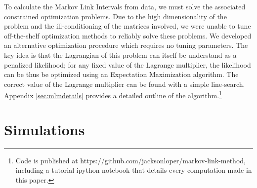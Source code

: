 \documentclass{article}
\theoremstyle{definition}
\begin{document}
To calculate the Markov Link Intervals from data, we must solve the associated constrained optimization problems.  Due to the high dimensionality of the problem and the ill-conditioning of the matrices involved, we were unable to tune off-the-shelf optimization methods to reliably solve these problems.  We developed an alternative optimization procedure which requires no tuning parameters.  The key idea is that the Lagrangian of this problem can itself be understand as a penalized likelihood; for any fixed value of the Lagrange multiplier, the likelihood can be thus be optimized using an Expectation Maximization algorithm.  The correct value of the Lagrange multiplier can be found with a simple line-search.  Appendix \ref{sec:mlmdetails} provides a detailed outline of the algorithm.\footnote{Code is published at https://github.com/jacksonloper/markov-link-method, including a tutorial ipython notebook that details every computation made in this paper.}  

                                                     
\section{Simulations}
\end{document}
